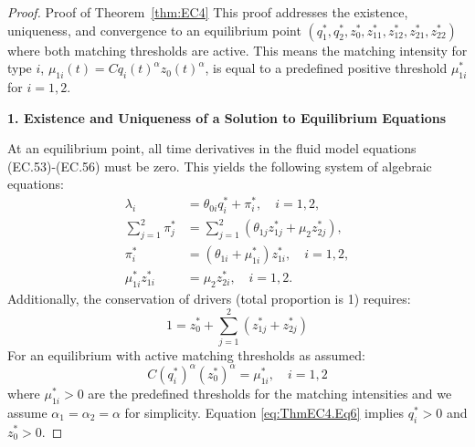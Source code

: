 \begin{proof}{Proof of Theorem~\ref{thm:EC4}}
This proof addresses the existence, uniqueness, and convergence to an equilibrium point $(q_1^*, q_2^*, z_0^*, z_{11}^*, z_{12}^*, z_{21}^*, z_{22}^*)$ where both matching thresholds are active.
This means the matching intensity for type $i$, $\mu_{1i}(t) = C q_i(t)^{\alpha} z_0(t)^{\alpha}$, is equal to a predefined positive threshold $\mu_{1i}^*$ for $i=1,2$.

\textbf{1. Existence and Uniqueness of a Solution to Equilibrium Equations}

At an equilibrium point, all time derivatives in the fluid model equations (EC.53)-(EC.56) must be zero. This yields the following system of algebraic equations:
\begin{align}
\lambda_i &= \theta_{0i}q_i^* + \pi_i^*, \quad i=1,2, \label{eq:ThmEC4.Eq1}  \\
\sum_{j=1}^{2}\pi_j^* &= \sum_{j=1}^{2}(\theta_{1j}z_{1j}^* + \mu_{2}z_{2j}^*), \label{eq:ThmEC4.Eq2} \\
\pi_i^* &= (\theta_{1i} + \mu_{1i}^*)z_{1i}^*, \quad i=1,2, \label{eq:ThmEC4.Eq3}  \\
\mu_{1i}^*z_{1i}^* &= \mu_{2}z_{2i}^*, \quad i=1,2. \label{eq:ThmEC4.Eq4} 
\end{align}
Additionally, the conservation of drivers (total proportion is 1) requires:
\begin{equation}
1 = z_0^* + \sum_{j=1}^{2}(z_{1j}^* + z_{2j}^*) \label{eq:ThmEC4.Eq5} 
\end{equation}
For an equilibrium with active matching thresholds as assumed:
\begin{equation}
C (q_i^*)^{\alpha} (z_0^*)^{\alpha} = \mu_{1i}^*, \quad i=1,2 \label{eq:ThmEC4.Eq6} 
\end{equation}
where $\mu_{1i}^* > 0$ are the predefined thresholds for the matching intensities and we assume $\alpha_1 = \alpha_2 = \alpha$ for simplicity. 
Equation \eqref{eq:ThmEC4.Eq6} implies $q_i^* > 0$ and $z_0^* > 0$.


\end{proof}
